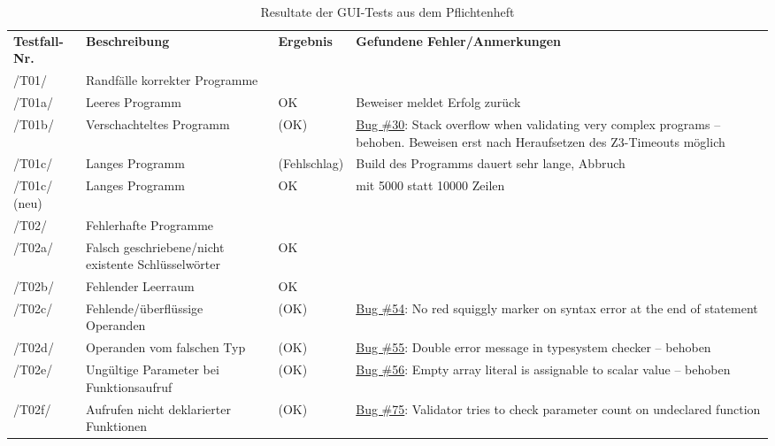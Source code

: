 \begin{landscape}

\begin{longtable}{lp{8cm}lp{10cm}}
\label{tests-pflichtenheft} \\
\caption{Resultate der GUI-Tests aus dem Pflichtenheft} \\
\toprule
\textbf{Testfall-Nr.} & \textbf{Beschreibung} & \textbf{Ergebnis} & \textbf{Gefundene Fehler/Anmerkungen} \\
\midrule
\midrule

\endhead

\endfoot

/T01/ & Randfälle korrekter Programme &  &  \\ \midrule
/T01a/ & Leeres Programm & OK & Beweiser meldet Erfolg zurück \\ \midrule
/T01b/ & Verschachteltes Programm & (OK) & \href{https://github.com/team-worthwhile/worthwhile/issues/30}{\href{https://github.com/team-worthwhile/worthwhile/issues/30}{Bug \#30}}: Stack overflow when validating very complex programs – behoben. Beweisen erst nach Heraufsetzen des Z3-Timeouts möglich \\ \midrule
/T01c/ & Langes Programm & (Fehlschlag) & Build des Programms dauert sehr lange, Abbruch \\ \midrule
/T01c/ (neu) & Langes Programm & OK & mit 5000 statt 10000 Zeilen \\ \midrule
\midrule
/T02/ & Fehlerhafte Programme &  &  \\ \midrule
/T02a/ & Falsch geschriebene/nicht existente Schlüsselwörter & OK &  \\ \midrule
/T02b/ & Fehlender Leerraum & OK &  \\ \midrule
/T02c/ & Fehlende/überflüssige Operanden & (OK) & \href{https://github.com/team-worthwhile/worthwhile/issues/54}{Bug \#54}: No red squiggly marker on syntax error at the end of statement \\ \midrule
/T02d/ & Operanden vom falschen Typ & (OK) & \href{https://github.com/team-worthwhile/worthwhile/issues/55}{Bug \#55}: Double error message in typesystem checker – behoben \\ \midrule
/T02e/ & Ungültige Parameter bei Funktionsaufruf & (OK) & \href{https://github.com/team-worthwhile/worthwhile/issues/56}{Bug \#56}: Empty array literal is assignable to scalar value – behoben \\ \midrule
/T02f/ & Aufrufen nicht deklarierter Funktionen & (OK) & \href{https://github.com/team-worthwhile/worthwhile/issues/75}{Bug \#75}: Validator tries to check parameter count on undeclared function \\ \midrule

\end{longtable}
\end{landscape}
